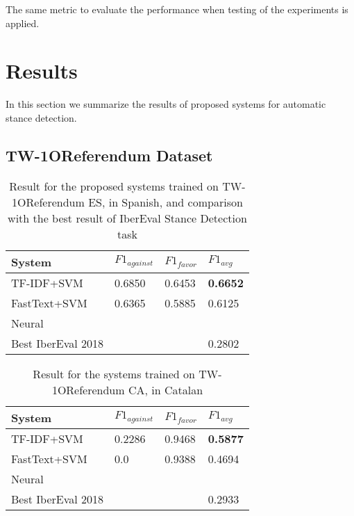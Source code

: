 \documentclass[10pt, a4paper]{article}
\begin{document}
The same metric to evaluate the performance when testing of the experiments is applied. 


\section{Results}

In this section we summarize the results of proposed systems for automatic stance detection.

\subsection{TW-1OReferendum Dataset}

\begin{table}[h]
\begin{center}
\begin{tabularx}{\columnwidth}{|l|l|l|X|}

\hline
System &$F1_{against}$&$F1_{favor}$&$F1_{avg}$\\ 
\hline
TF-IDF+SVM &0.6850& 0.6453&\textbf{0.6652}\\ 
\hline
FastText+SVM&0.6365&0.5885&0.6125\\ 
\hline
Neural     & &   &  \\
\hline
Best IberEval 2018 &  & &0.2802\\ 
\hline

\end{tabularx}
\caption{Result for the proposed systems trained on TW-1OReferendum ES, in Spanish, and comparison with the best result of IberEval Stance Detection task}
    \end{center}
    \label{tab:result_tw1o_es}
\end{table}


\begin{table}[!h]
\begin{center}
\begin{tabularx}{\columnwidth}{|l|l|l|X|}
\hline
System & $F1_{against}$ & $F1_{favor}$ &$F1_{avg}$\\
\hline
TF-IDF+SVM & 0.2286& 0.9468& \textbf{0.5877} \\
\hline
FastText+SVM& 0.0 & 0.9388&0.4694 \\
\hline
Neural      &   &  &\\ 
\hline
Best IberEval 2018 &    &   &0.2933 \\ 
\hline

\end{tabularx}
\caption{Result for the systems trained on TW-1OReferendum CA, in Catalan}
\end{center}
\label{tab:result_tw1o_ca}
\end{table}
\end{document}
